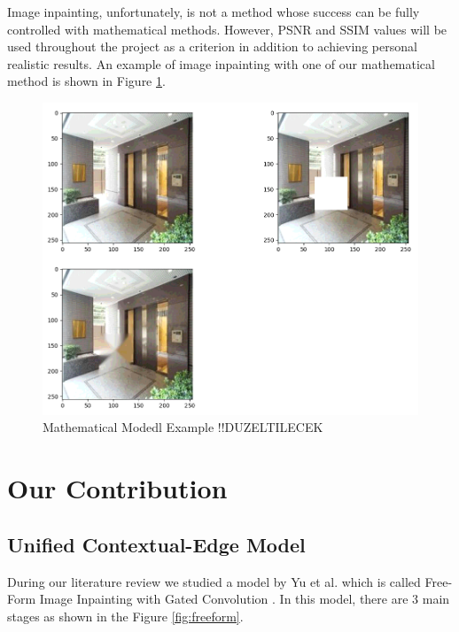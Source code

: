 Image inpainting, unfortunately, is not a method whose success can be fully controlled with mathematical methods. However, PSNR and SSIM values will be used throughout the project as a criterion in addition to achieving personal realistic results. An example of image inpainting with one of our mathematical method is shown in Figure \ref{fig:mathmodel}.

\begin{figure}[h]
    \centering
    \includegraphics[scale=0.4]{figures/chapter5/testMath.PNG}
    \caption{Mathematical Modedl Example !!DUZELTILECEK}
    \label{fig:mathmodel}
\end{figure}

\section{Our Contribution}

\subsection{Unified Contextual-Edge Model}
During our literature review we studied a model by Yu et al. which is called Free-Form Image Inpainting with Gated Convolution \cite{freeform_inpainting}. In this model, there are 3 main stages as shown in the Figure \ref{fig:freeform}.

